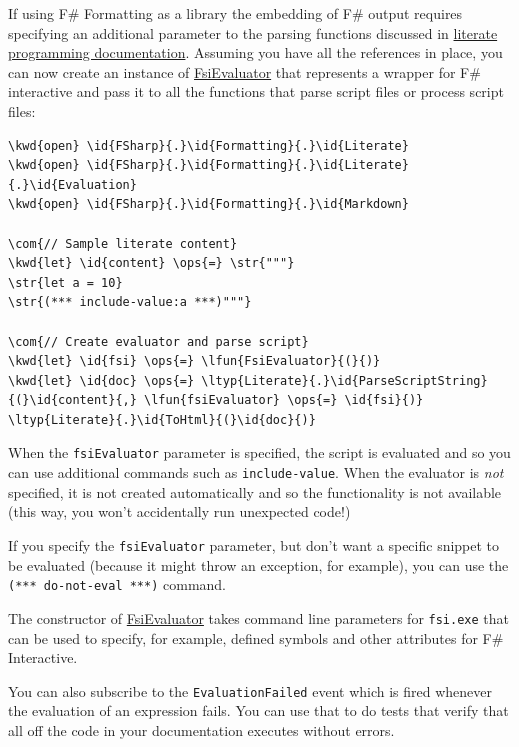 \documentclass{article}
\newcommand{\id}[1]{\textcolor{black}{#1}}
\newcommand{\com}[1]{\textcolor{officegreen}{#1}}
\newcommand{\kwd}[1]{\textcolor{navy}{#1}}
\newcommand{\ops}[1]{\textcolor{purple}{#1}}
\newcommand{\str}[1]{\textcolor{olive}{#1}}
\begin{document}
If using F\# Formatting as a library the embedding of F\# output requires specifying an additional parameter to the
parsing functions discussed in \href{literate.html}{literate programming documentation}.
Assuming you have all the references in place, you can now create an instance of
\href{https://fsprojects.github.io/FSharp.Formatting/reference/fsharp-formatting-literate-evaluation-fsievaluator.html}{FsiEvaluator} that represents a wrapper for F\# interactive and pass it to all the
functions that parse script files or process script files:
\begin{Verbatim}[commandchars=\\\{\}]
\kwd{open} \id{FSharp}{.}\id{Formatting}{.}\id{Literate}
\kwd{open} \id{FSharp}{.}\id{Formatting}{.}\id{Literate}{.}\id{Evaluation}
\kwd{open} \id{FSharp}{.}\id{Formatting}{.}\id{Markdown}

\com{// Sample literate content}
\kwd{let} \id{content} \ops{=} \str{"""}
\str{let a = 10}
\str{(*** include-value:a ***)"""}

\com{// Create evaluator and parse script}
\kwd{let} \id{fsi} \ops{=} \lfun{FsiEvaluator}{(}{)}
\kwd{let} \id{doc} \ops{=} \ltyp{Literate}{.}\id{ParseScriptString}{(}\id{content}{,} \lfun{fsiEvaluator} \ops{=} \id{fsi}{)}
\ltyp{Literate}{.}\id{ToHtml}{(}\id{doc}{)}
\end{Verbatim}



When the \texttt{fsiEvaluator} parameter is specified, the script is evaluated and so you
can use additional commands such as \texttt{include-value}. When the evaluator is \emph{not} specified,
it is not created automatically and so the functionality is not available (this way,
you won't accidentally run unexpected code!)


If you specify the \texttt{fsiEvaluator} parameter, but don't want a specific snippet to be evaluated
(because it might throw an exception, for example), you can use the \texttt{(*** do-not-eval ***)}
command.


The constructor of \href{https://fsprojects.github.io/FSharp.Formatting/reference/fsharp-formatting-literate-evaluation-fsievaluator.html}{FsiEvaluator} takes command line parameters for \texttt{fsi.exe} that can
be used to specify, for example, defined symbols and other attributes for F\# Interactive.


You can also subscribe to the \texttt{EvaluationFailed} event which is fired whenever the evaluation
of an expression fails. You can use that to do tests that verify that all off the code in your
documentation executes without errors.
\end{document}
